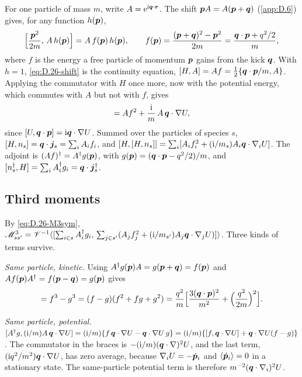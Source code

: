 For one particle of mass $m$, write $A = \mathrm{e}^{\mathrm{i}\bm{q}\cdot\bm{r}}$. The shift $\bm{p}A = A(\bm{p} + \bm{q})$ (\cref{app:D.6}) gives, for any function $h(\bm{p})$,
\begin{equation}
  \Bigl[\frac{\bm{p}^2}{2m},\,A\,h(\bm{p})\Bigr] = A\,f(\bm{p})\,h(\bm{p}) , \qquad f(\bm{p}) = \frac{(\bm{p} + \bm{q})^2 - \bm{p}^2}{2m} = \frac{\bm{q}\cdot\bm{p} + q^2/2}{m} ,
  \label{eq:D.26-shift}
\end{equation}
where $f$ is the energy a free particle of momentum $\bm{p}$ gains from the kick $\bm{q}$. With $h = 1$, \cref{eq:D.26-shift} is the continuity equation, $[H, A] = Af = \frac12\{\bm{q}\cdot\bm{p}/m, A\}$. Applying the commutator with $H$ once more, now with the potential energy, which commutes with $A$ but not with $f$, gives
\begin{equation}
  [H, Af] = A f^2 + \frac{\ii}{m}\,A\,\vect{q}\cdot\nabla U ,
  \label{eq:D.26-HAf}
\end{equation}
since $[U, \bm{q}\cdot\bm{p}] = \mathrm{i}\bm{q}\cdot\nabla U$. Summed over the particles of species $s$, $[H, n_s] = \bm{q}\cdot\bm{j}_s = \sum_iA_if_i$, and $[H, [H, n_s]] = \sum_i[A_if_i^2 + (\mathrm{i}/m_s)A_i\bm{q}\cdot\nabla_iU]$. The adjoint is $(Af)^\dagger = A^\dagger g(\bm{p})$, with $g(\bm{p}) = (\bm{q}\cdot\bm{p} - q^2/2)/m$, and $[n_s^\dagger, H] = \sum_iA_i^\dagger g_i = \bm{q}\cdot\bm{j}_s^\dagger$.

\subsection{Third moments}

By \cref{eq:D.26-M3sym}, $\mathscr{M}^3_{ss'} = \mathscr{V}^{-1}\langle[\sum_{i\in s}A_i^\dagger g_i,\,\sum_{j\in s'}(A_jf_j^2 + (\mathrm{i}/m_{s'})A_j\bm{q}\cdot\nabla_jU)]\rangle$. Three kinds of terms survive.

\emph{Same particle, kinetic.} Using $A^\dagger g(\bm{p})A = g(\bm{p} + \bm{q}) = f(\bm{p})$ and $Af(\bm{p})A^\dagger = f(\bm{p} - \bm{q}) = g(\bm{p})$ gives
\begin{equation*}
  [A^\dagger g, Af^2] = f^3 - g^3 = (f - g)(f^2 + fg + g^2) = \frac{q^2}{m}\Bigl[\frac{3(\vect{q}\cdot\vect{p})^2}{m^2} + \Bigl(\frac{q^2}{2m}\Bigr)^2\Bigr] .
\end{equation*}

\emph{Same particle, potential.} $[A^\dagger g, (\mathrm{i}/m)A\,\bm{q}\cdot\nabla U] = (\mathrm{i}/m)\{f\,\bm{q}\cdot\nabla U - \bm{q}\cdot\nabla U\,g\} = (\mathrm{i}/m)\{[f, \bm{q}\cdot\nabla U] + \bm{q}\cdot\nabla U(f - g)\}$. The commutator in the braces is $-(\mathrm{i}/m)(\bm{q}\cdot\nabla)^2U$, and the last term, $(\mathrm{i} q^2/m^2)\bm{q}\cdot\nabla U$, has zero average, because $\nabla_iU = -\dot{\bm{p}}_i$ and $\langle\dot{\bm{p}}_i\rangle = 0$ in a stationary state. The same-particle potential term is therefore $m^{-2}(\bm{q}\cdot\nabla_i)^2U$.

